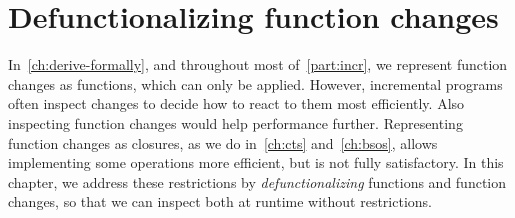 









\def\deriveDefCore{%
\begin{align*}
  \ensuremath{\Derive{\lambda (\Varid{x}\typcolon\sigma)\to \Varid{t}}} &= \ensuremath{\lambda (\Varid{x}\typcolon\sigma)\;(\Varid{dx}\typcolon\Delta \sigma)\to \Derive{\Varid{t}}} \\
  \ensuremath{\Derive{\Varid{s}\;\Varid{t}}} &= \ensuremath{\Derive{\Varid{s}}\;\Varid{t}\;\Derive{\Varid{t}}} \\
  \ensuremath{\Derive{\Varid{x}}} &= \ensuremath{\Varid{dx}} \\
  \ensuremath{\Derive{\Varid{c}}} &= \ensuremath{\DeriveConst{\Varid{c}}}
\end{align*}
}





\chapter{Defunctionalizing function changes}
\label{ch:defunc-fun-changes}

In~\cref{ch:derive-formally}, and throughout most of~\cref{part:incr}, we represent
function changes as functions, which can only be applied.
However, incremental programs often inspect changes to decide how to
react to them most efficiently. Also inspecting function changes would help
performance further.
Representing function changes as closures, as we do in~\cref{ch:cts}
and~\cref{ch:bsos}, allows implementing some operations more efficient, but is
not fully satisfactory.
In this chapter, we address these restrictions by \emph{defunctionalizing}
functions and function changes, so that we can inspect both at runtime without
restrictions.


